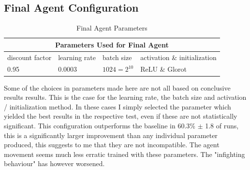 \subsection{Final Agent Configuration}\label{subsec:tr:opt:configuration}
\begin{table}[H]
    \begin{center}
    \begin{tabular}{|l|l|l|l|}
        \hline
        \multicolumn{4}{|c|}{Parameters Used for Final Agent}\\
        \hline
        \hline
        discount factor & learning rate & batch size & activation \& initialization \\
        \hline
        0.95 & 0.0003 & $1024 = 2^{10}$ & ReLU \& Glorot\\
        \hline
    \end{tabular}
    \end{center}
    \caption{Final Agent Parameters}
    \label{tab:final_agent_parameters}
\end{table}

\noindent
Some of the choices in parameters made here are not all based on conclusive results results. This is the case for the learning rate, the batch size and activation / initialization method. In these cases I simply selected the parameter which yielded the best results in the respective test, even if these are not statistically significant. This configuration outperforms the baseline in 60.3\% $\pm$ 1.8 of runs, this is a significantly larger improvement than any individual parameter produced, this suggests to me that they are not incompatible. The agent movement seems much less erratic trained with these parameters. The "infighting behaviour" has however worsened. 


